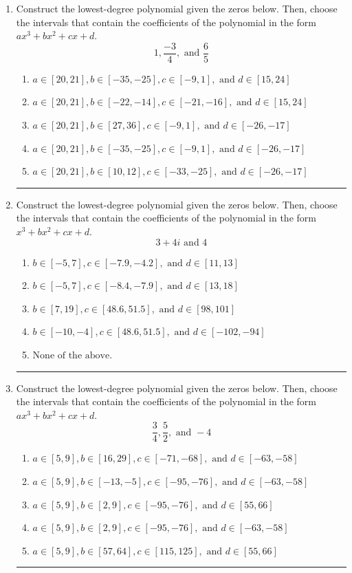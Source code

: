\documentclass[14pt]{extbook}
\newcommand{\litem}[1]{\item#1\hspace*{-1cm}\rule{\textwidth}{0.4pt}}
\begin{document}
\begin{enumerate}
\litem{
Construct the lowest-degree polynomial given the zeros below. Then, choose the intervals that contain the coefficients of the polynomial in the form $ax^3+bx^2+cx+d$.\[ 1, \frac{-3}{4}, \text{ and } \frac{6}{5} \]\begin{enumerate}[label=\Alph*.]
\item \( a \in [20, 21], b \in [-35, -25], c \in [-9, 1], \text{ and } d \in [15, 24] \)
\item \( a \in [20, 21], b \in [-22, -14], c \in [-21, -16], \text{ and } d \in [15, 24] \)
\item \( a \in [20, 21], b \in [27, 36], c \in [-9, 1], \text{ and } d \in [-26, -17] \)
\item \( a \in [20, 21], b \in [-35, -25], c \in [-9, 1], \text{ and } d \in [-26, -17] \)
\item \( a \in [20, 21], b \in [10, 12], c \in [-33, -25], \text{ and } d \in [-26, -17] \)

\end{enumerate} }
\litem{
Construct the lowest-degree polynomial given the zeros below. Then, choose the intervals that contain the coefficients of the polynomial in the form $x^3+bx^2+cx+d$.\[ 3 + 4 i \text{ and } 4 \]\begin{enumerate}[label=\Alph*.]
\item \( b \in [-5, 7], c \in [-7.9, -4.2], \text{ and } d \in [11, 13] \)
\item \( b \in [-5, 7], c \in [-8.4, -7.9], \text{ and } d \in [13, 18] \)
\item \( b \in [7, 19], c \in [48.6, 51.5], \text{ and } d \in [98, 101] \)
\item \( b \in [-10, -4], c \in [48.6, 51.5], \text{ and } d \in [-102, -94] \)
\item \( \text{None of the above.} \)

\end{enumerate} }
\litem{
Construct the lowest-degree polynomial given the zeros below. Then, choose the intervals that contain the coefficients of the polynomial in the form $ax^3+bx^2+cx+d$.\[ \frac{3}{4}, \frac{5}{2}, \text{ and } -4 \]\begin{enumerate}[label=\Alph*.]
\item \( a \in [5, 9], b \in [16, 29], c \in [-71, -68], \text{ and } d \in [-63, -58] \)
\item \( a \in [5, 9], b \in [-13, -5], c \in [-95, -76], \text{ and } d \in [-63, -58] \)
\item \( a \in [5, 9], b \in [2, 9], c \in [-95, -76], \text{ and } d \in [55, 66] \)
\item \( a \in [5, 9], b \in [2, 9], c \in [-95, -76], \text{ and } d \in [-63, -58] \)
\item \( a \in [5, 9], b \in [57, 64], c \in [115, 125], \text{ and } d \in [55, 66] \)


\end{enumerate}}
\end{enumerate}
\end{document}
